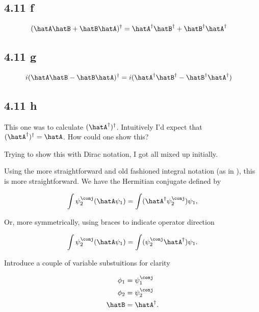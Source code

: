 \subsection{ 4.11 f}

\begin{align*}
(\hatA \hatB + \hatB \hatA)^\dagger &= \hatA^\dagger \hatB^\dagger + \hatB^\dagger \hatA^\dagger
\end{align*}

\subsection{ 4.11 g}

\begin{align*}
i (\hatA \hatB - \hatB \hatA)^\dagger &= i ( \hatA^\dagger \hatB^\dagger - \hatB^\dagger \hatA^\dagger)
\end{align*}

\subsection{ 4.11 h}

This one was to calculate $(\hatA^\dagger)^\dagger$.  Intuitively I'd expect that $(\hatA^\dagger)^\dagger = \hatA$.  How could one show this?

Trying to show this with Dirac notation, I got all mixed up initially.

Using the more straightforward and old fashioned integral notation (as in \cite{bohm1989qt}), this is more straightforward.  We have the Hermitian conjugate defined by

\begin{align*}
\int \psi_2^\conj (\hatA \psi_1) = \int (\hatA^\dagger \psi_2^\conj) \psi_1,
\end{align*}

Or, more symmetrically, using braces to indicate operator direction

\begin{align*}
\int \psi_2^\conj (\hatA \psi_1) = \int (\psi_2^\conj \hatA^\dagger) \psi_1.
\end{align*}

Introduce a couple of variable substuitions for clarity

\begin{align*}
\phi_1 &= \psi_1^\conj \\
\phi_2 &= \psi_2^\conj \\
\hatB &= \hatA^\dagger.
\end{align*}

